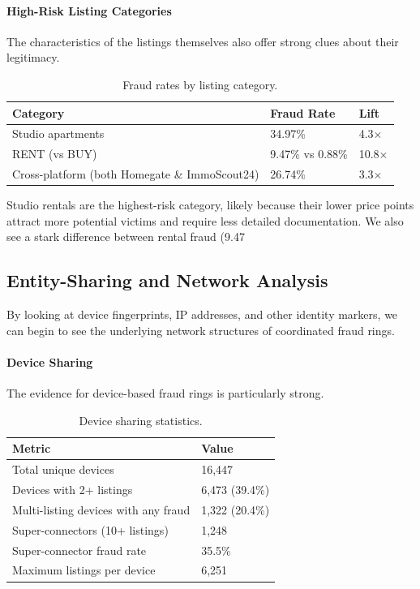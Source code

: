 \paragraph{High-Risk Listing Categories}
The characteristics of the listings themselves also offer strong clues about their legitimacy.

\begin{table}[h]
\centering
\caption{Fraud rates by listing category.}
\begin{tabular}{lll}
\hline
Category & Fraud Rate & Lift \\
\hline
Studio apartments & 34.97\% & 4.3$\times$ \\
RENT (vs BUY) & 9.47\% vs 0.88\% & 10.8$\times$ \\
Cross-platform (both Homegate \& ImmoScout24) & 26.74\% & 3.3$\times$ \\
\hline
\end{tabular}
\end{table}

Studio rentals are the highest-risk category, likely because their lower price points attract more potential victims and require less detailed documentation. We also see a stark difference between rental fraud (9.47%

\subsection{Entity-Sharing and Network Analysis}

By looking at device fingerprints, IP addresses, and other identity markers, we can begin to see the underlying network structures of coordinated fraud rings.

\paragraph{Device Sharing}
The evidence for device-based fraud rings is particularly strong.

\begin{table}[h]
\centering
\caption{Device sharing statistics.}
\begin{tabular}{ll}
\hline
Metric & Value \\
\hline
Total unique devices & 16,447 \\
Devices with 2+ listings & 6,473 (39.4\%) \\
Multi-listing devices with any fraud & 1,322 (20.4\%) \\
Super-connectors (10+ listings) & 1,248 \\
Super-connector fraud rate & 35.5\% \\
Maximum listings per device & 6,251 \\
\hline
\end{tabular}
\end{table}

